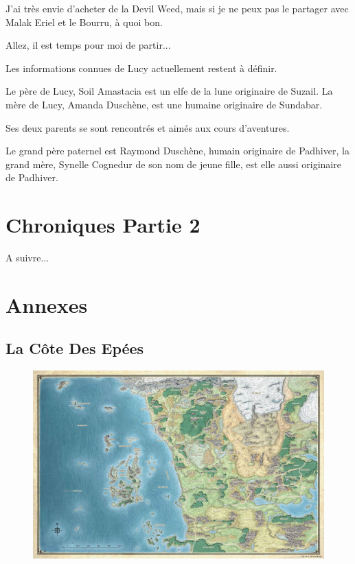 \documentclass[10pt,a4paper,twoside,twocolumn,openany]{book}
\begin{document}
J'ai très envie d'acheter de la Devil Weed, mais si je ne peux pas le partager avec 
Malak Eriel et le Bourru, à quoi bon.

Allez, il est temps pour moi de partir...

\begin{quotebox}
Les informations connues de Lucy actuellement restent à définir.

Le père de Lucy, Soil Amastacia est un elfe de la lune originaire de Suzail.
La mère de Lucy, Amanda Duschène, est une humaine originaire de Sundabar.

Ses deux parents se sont rencontrés et aimés aux cours d'aventures.

Le grand père paternel est Raymond Duschène, humain originaire de Padhiver, 
la grand mère, Synelle Cognedur de son nom de jeune fille, est elle aussi
originaire de Padhiver.
\end{quotebox}

\chapter{Chroniques Partie 2}

A suivre...

\onecolumn
\chapter{Annexes}

\section{La Côte Des Epées} 

\begin{figure}[!h]
\centering
\includegraphics[width=\textwidth,keepaspectratio]{soc.jpg}
\end{figure}
\end{document}
